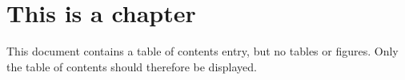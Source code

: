 \documentclass[lot,lof]{fithesis3}
\begin{document}
  \chapter{This is a chapter}
  This document contains a table of contents entry, but no tables
  or figures. Only the table of contents should therefore be
  displayed.
\end{document}
